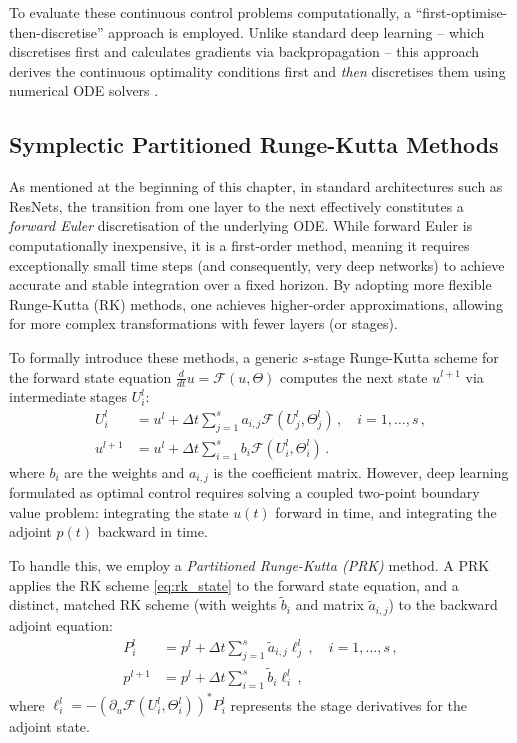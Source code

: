 To evaluate these continuous control problems computationally, a ``first-optimise-then-discretise'' approach is employed. Unlike standard deep learning -- which discretises first and calculates gradients via backpropagation -- this approach derives the continuous optimality conditions first and \emph{then} discretises them using numerical ODE solvers \cite{benning2019deep}.

\subsection{Symplectic Partitioned Runge-Kutta Methods}

As mentioned at the beginning of this chapter, in standard architectures such as ResNets, the transition from one layer to the next effectively constitutes a \emph{forward Euler} discretisation of the underlying ODE. While forward Euler is computationally inexpensive, it is a first-order method, meaning it requires exceptionally small time steps (and consequently, very deep networks) to achieve accurate and stable integration over a fixed horizon. By adopting more flexible Runge-Kutta (RK) methods, one achieves higher-order approximations, allowing for more complex transformations with fewer layers (or stages).

To formally introduce these methods, a generic $s$-stage Runge-Kutta scheme for the forward state equation $\frac{d}{dt}u = \mathcal{F}(u, \Theta)$ computes the next state $u^{l+1}$ via intermediate stages $U_i^l$:
\begin{subequations}
\label{eq:rk_state}
\begin{align}
    U_i^l &= u^l + \Delta t \sum_{j=1}^s a_{i,j} \mathcal{F}(U_j^l, \Theta_j^l) \, , \quad i = 1, \dots, s \, , \label{eq:rk_state_stage} \\
    u^{l+1} &= u^l + \Delta t \sum_{i=1}^s b_i \mathcal{F}(U_i^l, \Theta_i^l) \, . \label{eq:rk_state_update}
\end{align}
\end{subequations}
where $b_i$ are the weights and $a_{i,j}$ is the coefficient matrix. However, deep learning formulated as optimal control requires solving a coupled two-point boundary value problem: integrating the state $u(t)$ forward in time, and integrating the adjoint $p(t)$ backward in time. 

To handle this, we employ a \emph{Partitioned Runge-Kutta (PRK)} method. A PRK applies the RK scheme \eqref{eq:rk_state} to the forward state equation, and a distinct, matched RK scheme (with weights $\tilde{b}_i$ and matrix $\tilde{a}_{i,j}$) to the backward adjoint equation:
\begin{subequations}
\label{eq:rk_adjoint}
\begin{align}
    P_i^l &= p^l + \Delta t \sum_{j=1}^s \tilde{a}_{i,j} \ell_j^l \, , \quad i = 1, \dots, s \, , \label{eq:rk_adjoint_stage} \\
    p^{l+1} &= p^l + \Delta t \sum_{i=1}^s \tilde{b}_i \ell_i^l \, , \label{eq:rk_adjoint_update}
\end{align}
\end{subequations}
where $\ell_i^l = -\left(\partial_u \mathcal{F}(U_i^l, \Theta_i^l)\right)^* P_i^l$ represents the stage derivatives for the adjoint state.

